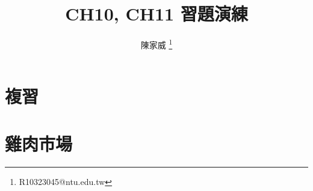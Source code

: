\documentclass[mathserif]{beamer}
\title{CH10, CH11 習題演練}
\author{陳家威 \thanks{R10323045@ntu.edu.tw}}
\begin{document}
    \begin{frame}
        \maketitle
    \end{frame}

    \section{複習}
    

    \section{雞肉市場}
    
\end{document}
